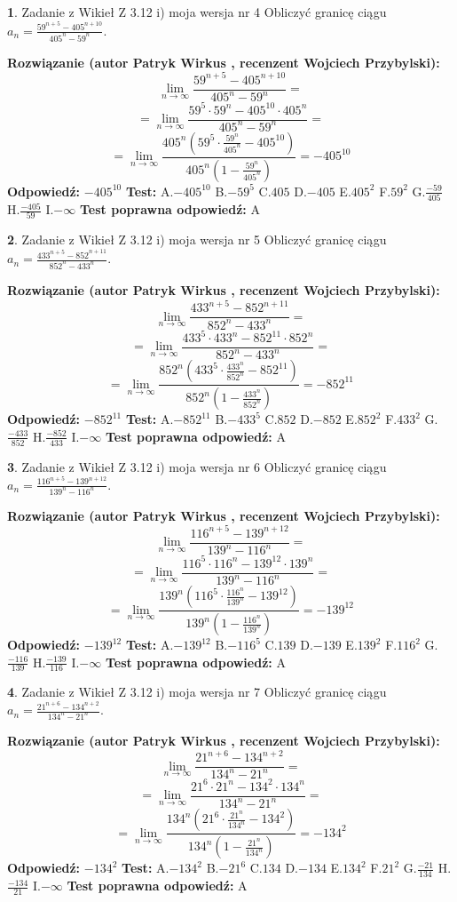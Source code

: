 \documentclass[12pt, a4paper]{article}
\theoremstyle{definition} %
\newtheorem{zad}{}
\newcommand{\zadStart}[1]{\begin{zad}#1\newline}
\newcommand{\zadStop}{\end{zad}}
\newcommand{\rozwStart}[2]{\noindent \textbf{Rozwiązanie (autor #1 , recenzent #2): }\newline}
\newcommand{\rozwStop}{\newline}
\newcommand{\odpStart}{\noindent \textbf{Odpowiedź:}\newline}
\newcommand{\odpStop}{\newline}
\newcommand{\testStart}{\noindent \textbf{Test:}\newline}
\newcommand{\testStop}{\newline}
\newcommand{\kluczStart}{\noindent \textbf{Test poprawna odpowiedź:}\newline}
\newcommand{\kluczStop}{\newline}
\begin{document}
\zadStart{Zadanie z Wikieł Z 3.12 i) moja wersja nr 4}
Obliczyć granicę ciągu $a_{n}=\frac{59^{n+5} - 405^{n+10}}{405^{n}-59^{n}}$.
\zadStop
\rozwStart{Patryk Wirkus}{Wojciech Przybylski}
$$\lim\limits_{n\to\infty}\frac{59^{n+5} - 405^{n+10}}{405^{n}-59^{n}}=$$
$$= \lim\limits_{n\to\infty}\frac{59^{5} \cdot 59^{n} - 405^{10} \cdot 405^{n}}{405^{n}-59^{n}}=$$
$$= \lim\limits_{n\to\infty}\frac{405^{n}(59^{5} \cdot \frac{59^{n}}{405^{n}} - 405^{10})}{405^{n}(1-\frac{59^{n}}{405^{n}})} = -405^{10}$$
\rozwStop
\odpStart
$-405^{10}$
\odpStop
\testStart
A.$-405^{10}$
B.$-59^{5}$
C.$405$
D.$-405$
E.$405^{2}$
F.$59^{2}$
G.$\frac{-59}{405}$
H.$\frac{-405}{59}$
I.$-\infty$
\testStop
\kluczStart
A
\kluczStop



\zadStart{Zadanie z Wikieł Z 3.12 i) moja wersja nr 5}
Obliczyć granicę ciągu $a_{n}=\frac{433^{n+5} - 852^{n+11}}{852^{n}-433^{n}}$.
\zadStop
\rozwStart{Patryk Wirkus}{Wojciech Przybylski}
$$\lim\limits_{n\to\infty}\frac{433^{n+5} - 852^{n+11}}{852^{n}-433^{n}}=$$
$$= \lim\limits_{n\to\infty}\frac{433^{5} \cdot 433^{n} - 852^{11} \cdot 852^{n}}{852^{n}-433^{n}}=$$
$$= \lim\limits_{n\to\infty}\frac{852^{n}(433^{5} \cdot \frac{433^{n}}{852^{n}} - 852^{11})}{852^{n}(1-\frac{433^{n}}{852^{n}})} = -852^{11}$$
\rozwStop
\odpStart
$-852^{11}$
\odpStop
\testStart
A.$-852^{11}$
B.$-433^{5}$
C.$852$
D.$-852$
E.$852^{2}$
F.$433^{2}$
G.$\frac{-433}{852}$
H.$\frac{-852}{433}$
I.$-\infty$
\testStop
\kluczStart
A
\kluczStop



\zadStart{Zadanie z Wikieł Z 3.12 i) moja wersja nr 6}
Obliczyć granicę ciągu $a_{n}=\frac{116^{n+5} - 139^{n+12}}{139^{n}-116^{n}}$.
\zadStop
\rozwStart{Patryk Wirkus}{Wojciech Przybylski}
$$\lim\limits_{n\to\infty}\frac{116^{n+5} - 139^{n+12}}{139^{n}-116^{n}}=$$
$$= \lim\limits_{n\to\infty}\frac{116^{5} \cdot 116^{n} - 139^{12} \cdot 139^{n}}{139^{n}-116^{n}}=$$
$$= \lim\limits_{n\to\infty}\frac{139^{n}(116^{5} \cdot \frac{116^{n}}{139^{n}} - 139^{12})}{139^{n}(1-\frac{116^{n}}{139^{n}})} = -139^{12}$$
\rozwStop
\odpStart
$-139^{12}$
\odpStop
\testStart
A.$-139^{12}$
B.$-116^{5}$
C.$139$
D.$-139$
E.$139^{2}$
F.$116^{2}$
G.$\frac{-116}{139}$
H.$\frac{-139}{116}$
I.$-\infty$
\testStop
\kluczStart
A
\kluczStop



\zadStart{Zadanie z Wikieł Z 3.12 i) moja wersja nr 7}
Obliczyć granicę ciągu $a_{n}=\frac{21^{n+6} - 134^{n+2}}{134^{n}-21^{n}}$.
\zadStop
\rozwStart{Patryk Wirkus}{Wojciech Przybylski}
$$\lim\limits_{n\to\infty}\frac{21^{n+6} - 134^{n+2}}{134^{n}-21^{n}}=$$
$$= \lim\limits_{n\to\infty}\frac{21^{6} \cdot 21^{n} - 134^{2} \cdot 134^{n}}{134^{n}-21^{n}}=$$
$$= \lim\limits_{n\to\infty}\frac{134^{n}(21^{6} \cdot \frac{21^{n}}{134^{n}} - 134^{2})}{134^{n}(1-\frac{21^{n}}{134^{n}})} = -134^{2}$$
\rozwStop
\odpStart
$-134^{2}$
\odpStop
\testStart
A.$-134^{2}$
B.$-21^{6}$
C.$134$
D.$-134$
E.$134^{2}$
F.$21^{2}$
G.$\frac{-21}{134}$
H.$\frac{-134}{21}$
I.$-\infty$
\testStop
\kluczStart
A
\kluczStop
\end{document}
